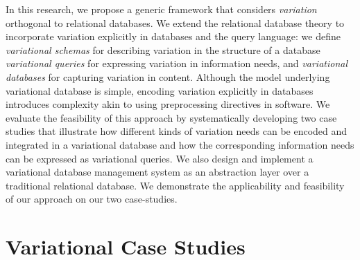 \documentclass[11pt]{article}
\begin{document}
%
%
%
%
In this research, we propose a generic framework that considers
\emph{variation} orthogonal to relational databases. 
We extend the relational database theory to incorporate variation
explicitly in databases and the query language:
we define \emph{variational schemas} for describing variation in the structure of a database
\emph{variational queries} for expressing variation in information needs, 
and \emph{variational databases} for capturing variation in content. 
%
Although the model underlying variational database is simple, encoding variation
explicitly in databases introduces complexity akin to using preprocessing
directives in software. 
We evaluate the feasibility of this approach by systematically developing two case studies
that illustrate how different kinds of variation needs can be encoded and
integrated in a variational database and how the
corresponding information needs can be expressed as variational queries.
%
We also design and implement a variational database management system as an abstraction layer over a traditional relational database. We demonstrate the applicability and feasibility of our approach on our two case-studies.











\newpage

%


\appendix
\section{Variational Case Studies}
\label{sec:db}



\end{document}
